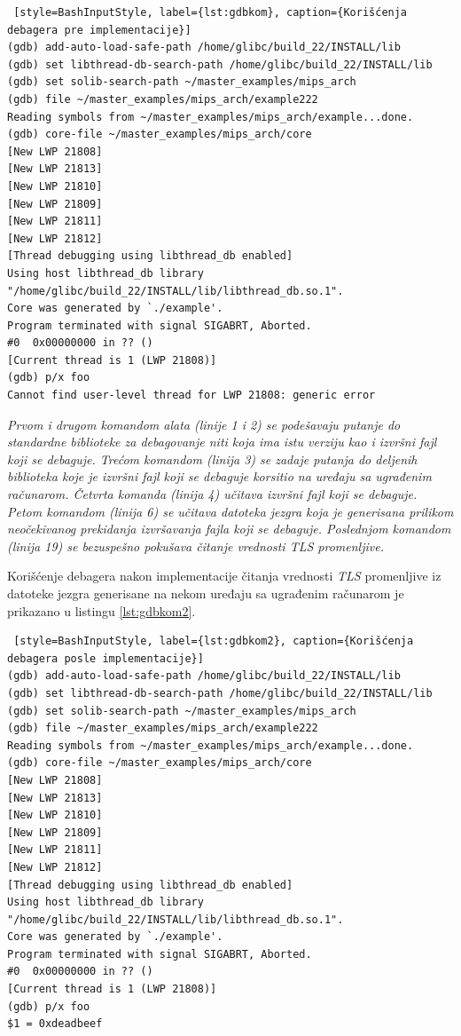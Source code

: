\documentclass[12pt,oneside]{memoir}
\begin{document}
\begin{lstlisting} [style=BashInputStyle, label={lst:gdbkom}, caption={Korišćenja debagera pre implementacije}]
(gdb) add-auto-load-safe-path /home/glibc/build_22/INSTALL/lib
(gdb) set libthread-db-search-path /home/glibc/build_22/INSTALL/lib
(gdb) set solib-search-path ~/master_examples/mips_arch
(gdb) file ~/master_examples/mips_arch/example222 
Reading symbols from ~/master_examples/mips_arch/example...done.
(gdb) core-file ~/master_examples/mips_arch/core
[New LWP 21808]
[New LWP 21813]
[New LWP 21810]
[New LWP 21809]
[New LWP 21811]
[New LWP 21812]
[Thread debugging using libthread_db enabled]
Using host libthread_db library "/home/glibc/build_22/INSTALL/lib/libthread_db.so.1".
Core was generated by `./example'.
Program terminated with signal SIGABRT, Aborted.
#0  0x00000000 in ?? ()
[Current thread is 1 (LWP 21808)]
(gdb) p/x foo
Cannot find user-level thread for LWP 21808: generic error
\end{lstlisting}

\emph{Prvom i drugom komandom alata (linije 1 i 2) se podešavaju putanje do standardne biblioteke za debagovanje niti koja ima istu verziju kao i izvršni fajl koji se debaguje. Trećom komandom (linija 3) se zadaje putanja do deljenih biblioteka koje je izvršni fajl koji se debaguje korsitio na uređaju sa ugrađenim računarom. Četvrta komanda (linija 4) učitava izvršni fajl koji se debaguje. Petom komandom (linija 6) se učitava datoteka jezgra koja je generisana prilikom neočekivanog prekidanja izvršavanja fajla koji se debaguje. Poslednjom komandom (linija 19) se bezuspešno pokušava čitanje vrednosti \emph{TLS} promenljive.}

Korišćenje debagera nakon implementacije čitanja vrednosti \emph{TLS} promenljive iz datoteke jezgra generisane na nekom uređaju sa ugrađenim računarom je prikazano u listingu \ref{lst:gdbkom2}.\newpage

\begin{lstlisting} [style=BashInputStyle, label={lst:gdbkom2}, caption={Korišćenja debagera posle implementacije}]
(gdb) add-auto-load-safe-path /home/glibc/build_22/INSTALL/lib
(gdb) set libthread-db-search-path /home/glibc/build_22/INSTALL/lib
(gdb) set solib-search-path ~/master_examples/mips_arch
(gdb) file ~/master_examples/mips_arch/example222 
Reading symbols from ~/master_examples/mips_arch/example...done.
(gdb) core-file ~/master_examples/mips_arch/core
[New LWP 21808]
[New LWP 21813]
[New LWP 21810]
[New LWP 21809]
[New LWP 21811]
[New LWP 21812]
[Thread debugging using libthread_db enabled]
Using host libthread_db library "/home/glibc/build_22/INSTALL/lib/libthread_db.so.1".
Core was generated by `./example'.
Program terminated with signal SIGABRT, Aborted.
#0  0x00000000 in ?? ()
[Current thread is 1 (LWP 21808)]
(gdb) p/x foo
$1 = 0xdeadbeef
\end{lstlisting}
\end{document}

